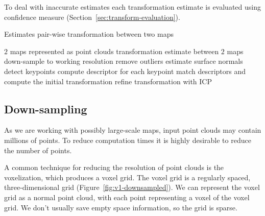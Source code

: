 To deal with inaccurate estimates each transformation estimate is evaluated using confidence measure (Section~\ref{sec:transform-evaluation}).

\begin{algorithm}
    \caption[Pair-wise transformation estimation]{Estimates pair-wise transformation between two maps}
    \label{alg:estimate-pair}
    \begin{algorithmic}[1]
        \Require $2$ maps represented as point clouds
        \Ensure transformation estimate between $2$ maps
            \State down-sample to working resolution
            \State remove outliers
            \State estimate surface normals
            \State detect keypoints
            \State compute descriptor for each keypoint
            \State match descriptors and compute the initial transformation
            \State refine transformation with \gls{ICP}
        \EndProcedure
    \end{algorithmic}
\end{algorithm}

\subsection{Down-sampling}
\label{sec:downsampling}

As we are working with possibly large-scale maps, input point clouds may contain millions of points. To reduce computation times it is highly desirable to reduce the number of points.

A common technique for reducing the resolution of point clouds is the voxelization, which produces a voxel grid. The voxel grid is a regularly spaced, three-dimensional grid (Figure~\ref{fig:v1-downsampled}). We can represent the voxel grid as a normal point cloud, with each point representing a voxel of the voxel grid. We don't usually save empty space information, so the grid is sparse.


